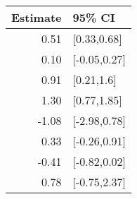 \begin{tabular}{rl}
  \hline
Estimate & 95\% CI \\ 
  \hline
0.51 & [0.33,0.68] \\ 
  0.10 & [-0.05,0.27] \\ 
  0.91 & [0.21,1.6] \\ 
  1.30 & [0.77,1.85] \\ 
  -1.08 & [-2.98,0.78] \\ 
  0.33 & [-0.26,0.91] \\ 
  -0.41 & [-0.82,0.02] \\ 
  0.78 & [-0.75,2.37] \\ 
   \hline
\end{tabular}


